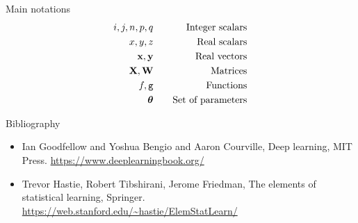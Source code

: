 \documentclass[xcolor=pdftex,dvipsnames,table,mathserif]{beamer}
\begin{document}



\begin{frame}{Main notations}
  \begin{eqnarray*}
    i, j, n, p, q & \hspace{1em} & \text{Integer scalars} \\
    x, y, z & \hspace{1em} & \text{Real scalars} \\
    \mathbf{x}, \mathbf{y} & \hspace{1em} & \text{Real vectors} \\
    \mathbf{X}, \mathbf{W} & \hspace{1em} & \text{Matrices} \\
    f, \texttt{g} & \hspace{1em} & \text{Functions} \\
    \boldsymbol{\theta} & \hspace{1em} & \text{Set of parameters} \\
    \end{eqnarray*}
\end{frame}


\begin{frame}{Bibliography}

  \begin{itemize}
  \item Ian Goodfellow and Yoshua Bengio and Aaron Courville, Deep learning, MIT Press. \url{https://www.deeplearningbook.org/}

  \item Trevor Hastie, Robert Tibshirani, Jerome Friedman, The elements of statistical learning, Springer. \url{https://web.stanford.edu/~hastie/ElemStatLearn/}

  \end{itemize}
\end{frame}



\end{document}
